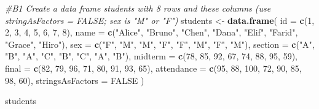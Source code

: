 \documentclass[
]{article}
\newenvironment{Shaded}{\begin{snugshade}}{\end{snugshade}}
\newcommand{\AttributeTok}[1]{\textcolor[rgb]{0.13,0.29,0.53}{#1}}
\newcommand{\CommentTok}[1]{\textcolor[rgb]{0.56,0.35,0.01}{\textit{#1}}}
\newcommand{\ConstantTok}[1]{\textcolor[rgb]{0.56,0.35,0.01}{#1}}
\newcommand{\DecValTok}[1]{\textcolor[rgb]{0.00,0.00,0.81}{#1}}
\newcommand{\FunctionTok}[1]{\textcolor[rgb]{0.13,0.29,0.53}{\textbf{#1}}}
\newcommand{\NormalTok}[1]{#1}
\newcommand{\OtherTok}[1]{\textcolor[rgb]{0.56,0.35,0.01}{#1}}
\newcommand{\StringTok}[1]{\textcolor[rgb]{0.31,0.60,0.02}{#1}}
\begin{document}
\begin{Shaded}
\begin{Highlighting}[]
\CommentTok{\#B1 Create a data frame students with 8 rows and these columns (use stringAsFactors = FALSE; sex is "M" or "F")}
\NormalTok{students }\OtherTok{\textless{}{-}} \FunctionTok{data.frame}\NormalTok{(}
  \AttributeTok{id =} \FunctionTok{c}\NormalTok{(}\DecValTok{1}\NormalTok{, }\DecValTok{2}\NormalTok{, }\DecValTok{3}\NormalTok{, }\DecValTok{4}\NormalTok{, }\DecValTok{5}\NormalTok{, }\DecValTok{6}\NormalTok{, }\DecValTok{7}\NormalTok{, }\DecValTok{8}\NormalTok{),}
  \AttributeTok{name =} \FunctionTok{c}\NormalTok{(}\StringTok{"Alice"}\NormalTok{, }\StringTok{"Bruno"}\NormalTok{, }\StringTok{"Chen"}\NormalTok{, }\StringTok{"Dana"}\NormalTok{, }\StringTok{"Elif"}\NormalTok{, }\StringTok{"Farid"}\NormalTok{, }\StringTok{"Grace"}\NormalTok{, }\StringTok{"Hiro"}\NormalTok{),}
  \AttributeTok{sex =} \FunctionTok{c}\NormalTok{(}\StringTok{"F"}\NormalTok{, }\StringTok{"M"}\NormalTok{, }\StringTok{"M"}\NormalTok{, }\StringTok{"F"}\NormalTok{, }\StringTok{"F"}\NormalTok{, }\StringTok{"M"}\NormalTok{, }\StringTok{"F"}\NormalTok{, }\StringTok{"M"}\NormalTok{),}
  \AttributeTok{section =} \FunctionTok{c}\NormalTok{(}\StringTok{"A"}\NormalTok{, }\StringTok{"B"}\NormalTok{, }\StringTok{"A"}\NormalTok{, }\StringTok{"C"}\NormalTok{, }\StringTok{"B"}\NormalTok{, }\StringTok{"C"}\NormalTok{, }\StringTok{"A"}\NormalTok{, }\StringTok{"B"}\NormalTok{),}
  \AttributeTok{midterm =} \FunctionTok{c}\NormalTok{(}\DecValTok{78}\NormalTok{, }\DecValTok{85}\NormalTok{, }\DecValTok{92}\NormalTok{, }\DecValTok{67}\NormalTok{, }\DecValTok{74}\NormalTok{, }\DecValTok{88}\NormalTok{, }\DecValTok{95}\NormalTok{, }\DecValTok{59}\NormalTok{),}
  \AttributeTok{final =} \FunctionTok{c}\NormalTok{(}\DecValTok{82}\NormalTok{, }\DecValTok{79}\NormalTok{, }\DecValTok{96}\NormalTok{, }\DecValTok{71}\NormalTok{, }\DecValTok{80}\NormalTok{, }\DecValTok{91}\NormalTok{, }\DecValTok{93}\NormalTok{, }\DecValTok{65}\NormalTok{),}
  \AttributeTok{attendance =} \FunctionTok{c}\NormalTok{(}\DecValTok{95}\NormalTok{, }\DecValTok{88}\NormalTok{, }\DecValTok{100}\NormalTok{, }\DecValTok{72}\NormalTok{, }\DecValTok{90}\NormalTok{, }\DecValTok{85}\NormalTok{, }\DecValTok{98}\NormalTok{, }\DecValTok{60}\NormalTok{),}
  \AttributeTok{stringsAsFactors =} \ConstantTok{FALSE}
\NormalTok{)}

\NormalTok{students}
\end{Highlighting}
\end{Shaded}
\end{document}
